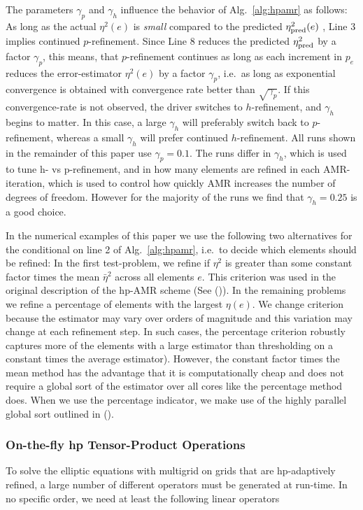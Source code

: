   The parameters $\gamma_p$ and $\gamma_h$
      influence the behavior of Alg.~\ref{alg:hpamr} as follows: As
      long as the actual $\eta^2(e)$ is \textit{small} compared to the
      predicted $\eta^2_{\rm pred}(e)$ , Line 3 implies continued
      $p$-refinement.  Since Line 8 reduces the predicted $\eta^2_{\rm
        pred}$ by a factor $\gamma_p$, this means, that $p$-refinement
      continues as long as each increment in $p_e$ reduces the
      error-estimator $\eta^2(e)$ by a factor $\gamma_p$, i.e.\ as
      long as exponential convergence is obtained with convergence
      rate better than $\sqrt{\gamma_p}$.  If this convergence-rate is
      not observed, the driver switches to $h$-refinement, and
      $\gamma_h$ begins to matter.  In this case, a large $\gamma_h$
      will preferably switch back to $p$-refinement, whereas a small
      $\gamma_h$ will prefer continued $h$-refinement.  All runs shown
      in the remainder of this paper use $\gamma_p=0.1$.  The runs
      differ in $\gamma_h$, which is used to tune h- vs p-refinement,
      and in how many elements are refined in each AMR-iteration,
      which is used to control how quickly AMR increases the number of
      degrees of freedom. However for the majority of the runs we find that $\gamma_h=0.25$ is a good choice.
  
In the numerical examples of this paper we use the
  following two alternatives for the conditional on line 2 of
  Alg.~\ref{alg:hpamr}, i.e.\ to decide which elements should be
  refined: In the first test-problem, we refine if $\eta^2$ is
greater than some constant factor times the mean $\bar \eta^2$ across all elements $e$. This criterion was used in the original description of the hp-AMR scheme (See (\citet*{melenk2001residual})).  In
the remaining problems we refine a percentage of elements with the largest $\eta(e)$. We change criterion because the estimator may vary over orders of magnitude and this variation may change at each refinement step. In such cases, the percentage criterion robustly captures more of the elements with a large estimator than thresholding on a constant times the average estimator). However, the constant factor times the
mean method has the advantage that it is computationally cheap and
does not require a global sort of the estimator over all cores like the
percentage method does. When we use the percentage indicator, we make use of the highly parallel global sort outlined in (\citet*{feng2015mp}).

\subsubsection{On-the-fly hp Tensor-Product Operations}
\label{sec:tensorproduct}
To solve the elliptic equations with multigrid on grids that are hp-adaptively refined, a large number of different operators must be generated at run-time. In no specific order, we need at least the following linear operators

